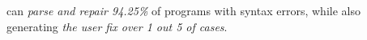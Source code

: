 \begin{framed}
  \noindent \toolname can \emph{parse and repair 94.25\%} of programs with
  syntax errors, while also generating \emph{the user fix over 1 out 5 of
  cases}.
\end{framed}


